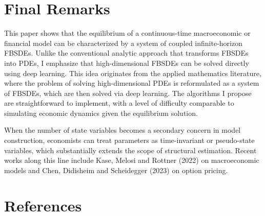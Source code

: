 \documentclass{article}
\begin{document}
\section{Final Remarks}

This paper shows that the equilibrium of a continuous-time macroeconomic or financial model can be characterized by a system of coupled infinite-horizon FBSDEs. Unlike the conventional analytic approach that transforms FBSDEs into PDEs, I emphasize that high-dimensional FBSDEs can be solved directly using deep learning. This idea originates from the applied mathematics literature, where the problem of solving high-dimensional PDEs is reformulated as a system of FBSDEs, which are then solved via deep learning. The algorithms I propose are straightforward to implement, with a level of difficulty comparable to simulating economic dynamics given the equilibrium solution.

When the number of state variables becomes a secondary concern in model construction, economists can treat parameters as time-invariant or pseudo-state variables, which substantially extends the scope of structural estimation. Recent works along this line include Kase, Melosi and Rottner (2022) on macroeconomic models and Chen, Didisheim and Scheidegger (2023) on option pricing.

\section*{References}
\end{document}
